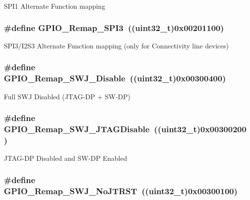 \label{group__GPIO__Remap__define_ga58b02a04a6041954c6e99e681716ab4c}
SPI1 Alternate Function mapping \hypertarget{group__GPIO__Remap__define_gac7fd74244a9d53ca02cc86bb6543a689}{
\subsubsection[{GPIO\_\-Remap\_\-SPI3}]{\setlength{\rightskip}{0pt plus 5cm}\#define GPIO\_\-Remap\_\-SPI3~((uint32\_\-t)0x00201100)}}
\label{group__GPIO__Remap__define_gac7fd74244a9d53ca02cc86bb6543a689}
SPI3/I2S3 Alternate Function mapping (only for Connectivity line devices) \hypertarget{group__GPIO__Remap__define_gaf4832412d0ba344bb9147142cfcda828}{
\subsubsection[{GPIO\_\-Remap\_\-SWJ\_\-Disable}]{\setlength{\rightskip}{0pt plus 5cm}\#define GPIO\_\-Remap\_\-SWJ\_\-Disable~((uint32\_\-t)0x00300400)}}
\label{group__GPIO__Remap__define_gaf4832412d0ba344bb9147142cfcda828}
Full SWJ Disabled (JTAG-\/DP + SW-\/DP) \hypertarget{group__GPIO__Remap__define_ga25fb8c789334694861444e48f486879d}{
\subsubsection[{GPIO\_\-Remap\_\-SWJ\_\-JTAGDisable}]{\setlength{\rightskip}{0pt plus 5cm}\#define GPIO\_\-Remap\_\-SWJ\_\-JTAGDisable~((uint32\_\-t)0x00300200)}}
\label{group__GPIO__Remap__define_ga25fb8c789334694861444e48f486879d}
JTAG-\/DP Disabled and SW-\/DP Enabled \hypertarget{group__GPIO__Remap__define_ga81009ef35f7f039365291cf4f6fc0c5b}{
\subsubsection[{GPIO\_\-Remap\_\-SWJ\_\-NoJTRST}]{\setlength{\rightskip}{0pt plus 5cm}\#define GPIO\_\-Remap\_\-SWJ\_\-NoJTRST~((uint32\_\-t)0x00300100)}}
